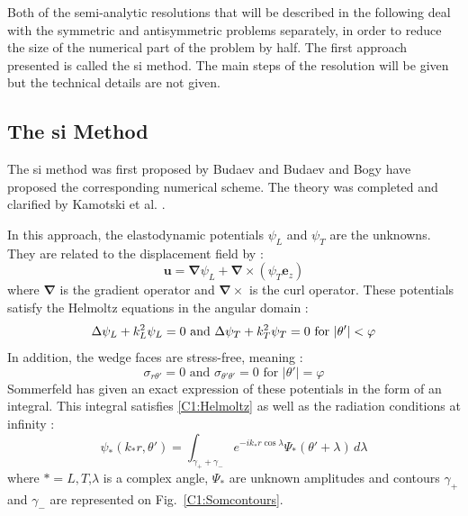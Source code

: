 Both of the semi-analytic resolutions that will be described in the following deal with the symmetric and antisymmetric problems separately, in order to reduce the size of the numerical part of the problem by half. The first approach presented is called the \acrfull{si} method. The main steps of the resolution will be given but the technical details are not given.

\subsection{The \acrfull{si} Method}
The \acrfull{si} method was first proposed by Budaev \cite{BudaevBook,Budaev1,Budaev2} and Budaev and Bogy \cite{Rayleigh,Rayleigh2,Rayleigh3} have proposed the corresponding numerical scheme. The theory was completed and clarified by Kamotski et al. \cite{KamotskiFradkin}.

In this approach, the elastodynamic potentials $\psi_L$ and $\psi_T$ are the unknowns. They are related to the displacement field by :
\begin{equation}
\mathbf{u}=\mathbf{\nabla}\psi_L+\mathbf{\nabla}\times(\psi_T\mathbf{e}_z)
\label{C1:elastopotentials}
\end{equation}
where $\mathbf{\nabla}$ is the gradient operator and $\mathbf{\nabla}\times$ is the curl operator. These potentials satisfy the Helmoltz equations in the angular domain \cite{Achenbach} :
\begin{equation}
\Delta \psi_L+k_L^2\psi_L=0 \mbox{ and } \Delta \psi_T+k_T^2\psi_T=0 \rm \mbox{ for } |\theta'|<\varphi
\label{C1:Helmoltz}
\end{equation}
In addition, the wedge faces are stress-free, meaning :
\begin{equation}
\sigma_{r\theta'}=0 \mbox{ and } \sigma_{\theta'\theta'}=0 \mbox{ for } |\theta'|=\varphi
\label{C1:stresses}
\end{equation}
Sommerfeld \cite{Sommerfeld} has given an exact expression of these potentials in the form of an integral. This integral satisfies \eqref{C1:Helmoltz} as well as the radiation conditions at infinity \cite{SMtechnique} :
\begin{equation}
\psi_*(k_*r,\theta')=\int_{\gamma_++\gamma_-}e^{-ik_*r\cos\lambda}\Psi_*(\theta'+\lambda)\,d\lambda
\label{C1:Sommerfeld}
\end{equation}
where $*=L,T$,$\lambda$ is a complex angle, $\Psi_*$ are unknown amplitudes and contours $\gamma_+$ and $\gamma_-$ are represented on Fig.~\ref{C1:Somcontours}.

